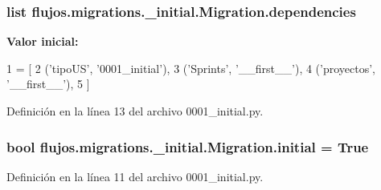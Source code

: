 \subsubsection[{\texorpdfstring{dependencies}{dependencies}}]{\setlength{\rightskip}{0pt plus 5cm}list flujos.\+migrations.\+\_\+initial.\+Migration.\+dependencies\hspace{0.3cm}{\ttfamily [static]}}\hypertarget{classflujos_1_1migrations_1_10001__initial_1_1_migration_ab8abf92bf1fd8e340abf54a0b9b53a4a}{}\label{classflujos_1_1migrations_1_10001__initial_1_1_migration_ab8abf92bf1fd8e340abf54a0b9b53a4a}
{\bfseries Valor inicial\+:}
\begin{DoxyCode}
1 = [
2         (\textcolor{stringliteral}{'tipoUS'}, \textcolor{stringliteral}{'0001\_initial'}),
3         (\textcolor{stringliteral}{'Sprints'}, \textcolor{stringliteral}{'\_\_first\_\_'}),
4         (\textcolor{stringliteral}{'proyectos'}, \textcolor{stringliteral}{'\_\_first\_\_'}),
5     ]
\end{DoxyCode}


Definición en la línea 13 del archivo 0001\+\_\+initial.\+py.

\subsubsection[{\texorpdfstring{initial}{initial}}]{\setlength{\rightskip}{0pt plus 5cm}bool flujos.\+migrations.\+\_\+initial.\+Migration.\+initial = True\hspace{0.3cm}{\ttfamily [static]}}\hypertarget{classflujos_1_1migrations_1_10001__initial_1_1_migration_acac33de22b59ff2f084554f135ec7237}{}\label{classflujos_1_1migrations_1_10001__initial_1_1_migration_acac33de22b59ff2f084554f135ec7237}


Definición en la línea 11 del archivo 0001\+\_\+initial.\+py.

